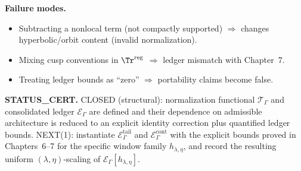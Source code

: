 \medskip
\noindent\textbf{Failure modes.}
\begin{itemize}
\item[(F8.1)] Subtracting a nonlocal term (not compactly supported) $\Rightarrow$ changes hyperbolic/orbit content (invalid normalization).
\item[(F8.2)] Mixing cusp conventions in $\Tr^{\mathrm{reg}}$ $\Rightarrow$ ledger mismatch with Chapter~7.
\item[(F8.3)] Treating ledger bounds as ``zero'' $\Rightarrow$ portability claims become false.
\end{itemize}

\medskip
\noindent\textbf{STATUS\_CERT.}
CLOSED (structural): normalization functional $\mathcal T_\Gamma$ and consolidated ledger $\mathcal E_\Gamma$ are defined and
their dependence on admissible architecture is reduced to an explicit identity correction plus quantified ledger bounds.
NEXT(1): instantiate $\mathcal E^{\mathrm{tail}}_\Gamma$ and $\mathcal E^{\mathrm{cont}}_\Gamma$ with the explicit bounds proved in Chapters~6--7
for the specific window family $h_{\lambda,\eta}$, and record the resulting uniform $(\lambda,\eta)$-scaling of $\mathcal E_\Gamma[h_{\lambda,\eta}]$.


